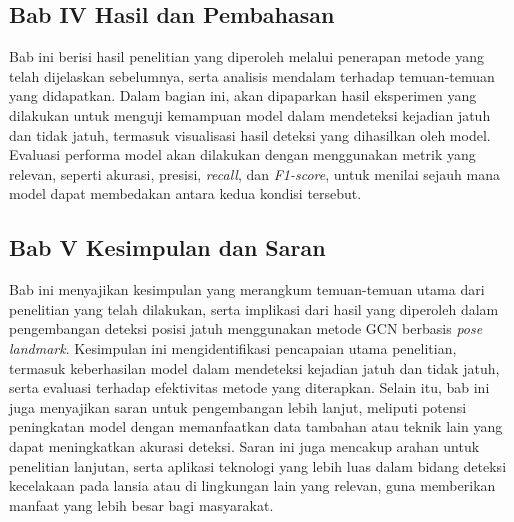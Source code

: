 \subsection{Bab IV Hasil dan Pembahasan}
Bab ini berisi hasil penelitian yang diperoleh melalui penerapan metode yang telah dijelaskan sebelumnya, serta analisis mendalam terhadap temuan-temuan yang didapatkan. Dalam bagian ini, akan dipaparkan hasil eksperimen yang dilakukan untuk menguji kemampuan model dalam mendeteksi kejadian jatuh dan tidak jatuh, termasuk visualisasi hasil deteksi yang dihasilkan oleh model. Evaluasi performa model akan dilakukan dengan menggunakan metrik yang relevan, seperti akurasi, presisi, \textit{recall}, dan \textit{F1-score}, untuk menilai sejauh mana model dapat membedakan antara kedua kondisi tersebut. \par

\subsection{Bab V Kesimpulan dan Saran}
Bab ini menyajikan kesimpulan yang merangkum temuan-temuan utama dari penelitian yang telah dilakukan, serta implikasi dari hasil yang diperoleh dalam pengembangan deteksi posisi jatuh menggunakan metode GCN berbasis \textit{pose landmark}. Kesimpulan ini mengidentifikasi pencapaian utama penelitian, termasuk keberhasilan model dalam mendeteksi kejadian jatuh dan tidak jatuh, serta evaluasi terhadap efektivitas metode yang diterapkan. Selain itu, bab ini juga menyajikan saran untuk pengembangan lebih lanjut, meliputi potensi peningkatan model dengan memanfaatkan data tambahan atau teknik lain yang dapat meningkatkan akurasi deteksi. Saran ini juga mencakup arahan untuk penelitian lanjutan, serta aplikasi teknologi yang lebih luas dalam bidang deteksi kecelakaan pada lansia atau di lingkungan lain yang relevan, guna memberikan manfaat yang lebih besar bagi masyarakat.\par
